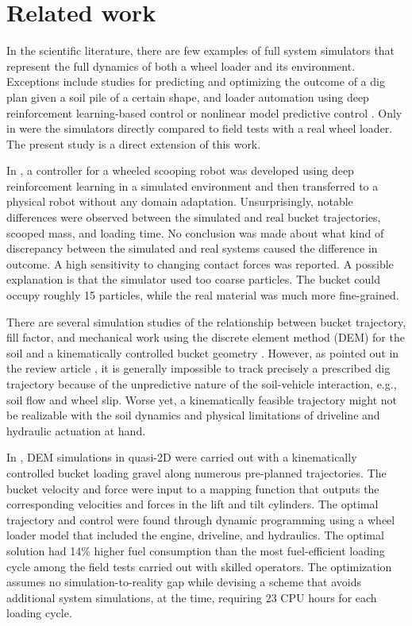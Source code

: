 \documentclass[10pt]{article}
\begin{document}
\section{Related work}
\label{sec:related_work}
 
In the scientific literature, there are few examples of full system simulators that represent 
the full dynamics of both a wheel loader and its environment. Exceptions include studies for 
predicting \cite{aoshima2021} and optimizing \cite{Lindmark2018} the outcome of a 
dig plan given a soil pile of a certain shape, and loader automation using deep reinforcement 
learning-based control \cite{backman2021} or nonlinear model 
predictive control \cite{song2022}. Only in \cite{aoshima2021} were the simulators directly 
compared to field tests with a real wheel loader. The present study is a direct extension of
this work. 

In \cite{Azulay2021}, a controller for a wheeled scooping robot was developed 
using deep reinforcement learning in a simulated environment and then transferred to a physical 
robot without any domain adaptation. Unsurprisingly, notable differences were observed between the simulated and real
bucket trajectories, scooped mass, and loading time. No conclusion was made about what kind 
of discrepancy between the simulated and real systems caused the difference in outcome.
A high sensitivity to changing contact forces was reported. A possible explanation is that the
simulator used too coarse particles. The bucket could occupy roughly 15 particles, while
the real material was much more fine-grained.

There are several simulation studies of the relationship between bucket trajectory, fill factor, and mechanical work
using the discrete element method (DEM) for the soil and a kinematically 
controlled bucket geometry \cite{Filla2017,Frank2018,meng2019,Wang2022a}. However, as pointed out in the review article 
\cite{Dadhich2016}, it is generally impossible to track precisely a prescribed dig trajectory
because of the unpredictive nature of the soil-vehicle interaction, e.g., 
soil flow and wheel slip.  Worse yet, a kinematically feasible trajectory might not be realizable 
with the soil dynamics and physical limitations of driveline and hydraulic actuation at hand.

In \cite{Frank2018}, DEM simulations in quasi-2D were carried out with a kinematically controlled bucket
loading gravel along numerous pre-planned trajectories. The bucket velocity and force were input
to a mapping function that outputs the corresponding velocities and forces in the 
lift and tilt cylinders. The optimal trajectory and control were found
through dynamic programming using a wheel loader model that included the engine, driveline, and hydraulics.
The optimal solution had 14\% higher fuel consumption than the most fuel-efficient loading cycle
among the field tests carried out with skilled operators.
The optimization assumes no simulation-to-reality gap while devising a scheme that avoids additional system simulations,
at the time, requiring 23 CPU hours for each loading cycle.
\end{document}
